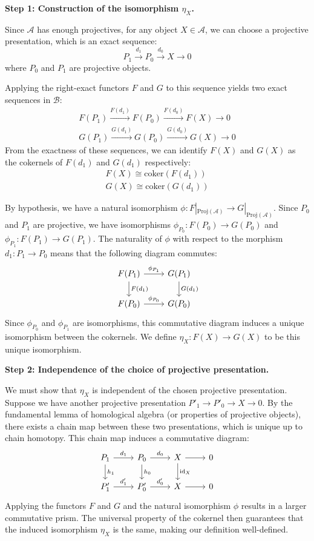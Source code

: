 \documentclass[11pt]{article}
\theoremstyle{definition}
\begin{document}
\textbf{Step 1: Construction of the isomorphism $\eta_X$.}

Since $\mathcal{A}$ has enough projectives, for any object $X \in \mathcal{A}$, we can choose a projective presentation, which is an exact sequence:
\[
P_1 \xrightarrow{d_1} P_0 \xrightarrow{d_0} X \to 0
\]
where $P_0$ and $P_1$ are projective objects.

Applying the right-exact functors $F$ and $G$ to this sequence yields two exact sequences in $\mathcal{B}$:
\begin{align*}
F(P_1) \xrightarrow{F(d_1)} F(P_0) \xrightarrow{F(d_0)} F(X) \to 0 \\
G(P_1) \xrightarrow{G(d_1)} G(P_0) \xrightarrow{G(d_0)} G(X) \to 0
\end{align*}
From the exactness of these sequences, we can identify $F(X)$ and $G(X)$ as the cokernels of $F(d_1)$ and $G(d_1)$ respectively:
\begin{align*}
F(X) \cong \text{coker}(F(d_1)) \\
G(X) \cong \text{coker}(G(d_1))
\end{align*}

By hypothesis, we have a natural isomorphism $\phi: F|_{\text{Proj}(\mathcal{A})} \to G|_{\text{Proj}(\mathcal{A})}$. Since $P_0$ and $P_1$ are projective, we have isomorphisms $\phi_{P_0}: F(P_0) \to G(P_0)$ and $\phi_{P_1}: F(P_1) \to G(P_1)$. The naturality of $\phi$ with respect to the morphism $d_1: P_1 \to P_0$ means that the following diagram commutes:
\[
\begin{tikzcd}
F(P_1) \arrow{r}{\phi_{P_1}} \arrow{d}{F(d_1)} & G(P_1) \arrow{d}{G(d_1)} \\
F(P_0) \arrow{r}{\phi_{P_0}} & G(P_0)
\end{tikzcd}
\]
Since $\phi_{P_0}$ and $\phi_{P_1}$ are isomorphisms, this commutative diagram induces a unique isomorphism between the cokernels. We define $\eta_X: F(X) \to G(X)$ to be this unique isomorphism.

\textbf{Step 2: Independence of the choice of projective presentation.}

We must show that $\eta_X$ is independent of the chosen projective presentation. Suppose we have another projective presentation $P'_1 \to P'_0 \to X \to 0$. By the fundamental lemma of homological algebra (or properties of projective objects), there exists a chain map between these two presentations, which is unique up to chain homotopy. This chain map induces a commutative diagram:
\[
\begin{tikzcd}
P_1 \arrow{r}{d_1} \arrow{d}{h_1} & P_0 \arrow{r}{d_0} \arrow{d}{h_0} & X \arrow{r} \arrow{d}{\text{id}_X} & 0 \\
P'_1 \arrow{r}{d'_1} & P'_0 \arrow{r}{d'_0} & X \arrow{r} & 0
\end{tikzcd}
\]
Applying the functors $F$ and $G$ and the natural isomorphism $\phi$ results in a larger commutative prism. The universal property of the cokernel then guarantees that the induced isomorphism $\eta_X$ is the same, making our definition well-defined.
\end{document}
